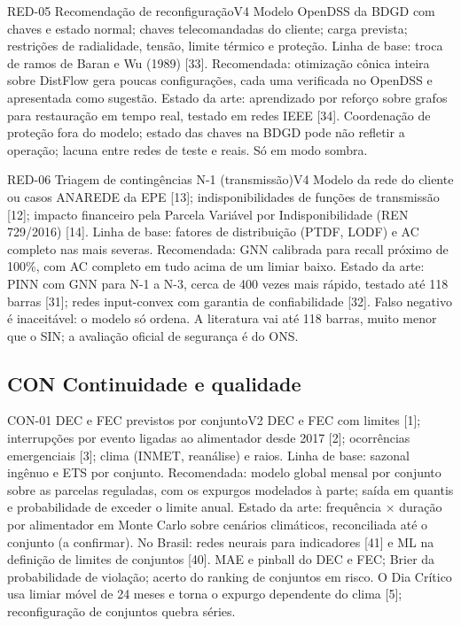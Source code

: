 \begin{ficha}{RED-05 \textperiodcentered{} Recomendação de reconfiguração}{V4}
 Modelo OpenDSS da BDGD com chaves e estado normal; chaves
telecomandadas do cliente; carga prevista; restrições de radialidade, tensão,
limite térmico e proteção.
 Linha de base: troca de ramos de Baran e Wu (1989) [33].
Recomendada: otimização cônica inteira sobre DistFlow gera poucas
configurações, cada uma verificada no OpenDSS e apresentada como sugestão.
Estado da arte: aprendizado por reforço sobre grafos para restauração em
tempo real, testado em redes IEEE [34].
 Coordenação de proteção fora do modelo; estado das chaves
na BDGD pode não refletir a operação; lacuna entre redes de teste e reais.
Só em modo sombra.
\end{ficha}

\begin{ficha}{RED-06 \textperiodcentered{} Triagem de contingências N-1 (transmissão)}{V4}
 Modelo da rede do cliente ou casos ANAREDE da EPE [13];
indisponibilidades de funções de transmissão [12]; impacto financeiro pela
Parcela Variável por Indisponibilidade (REN 729/2016) [14].
 Linha de base: fatores de distribuição (PTDF, LODF) e AC
completo nas mais severas. Recomendada: GNN calibrada para recall próximo de
100\%, com AC completo em tudo acima de um limiar baixo. Estado da arte: PINN
com GNN para N-1 a N-3, cerca de 400 vezes mais rápido, testado até 118 barras
[31]; redes input-convex com garantia de confiabilidade [32].
 Falso negativo é inaceitável: o modelo só ordena. A
literatura vai até 118 barras, muito menor que o SIN; a avaliação oficial de
segurança é do ONS.
\end{ficha}

\subsection{CON \textperiodcentered{} Continuidade e qualidade}

\begin{ficha}{CON-01 \textperiodcentered{} DEC e FEC previstos por conjunto}{V2}
 DEC e FEC com limites [1]; interrupções por evento ligadas ao
alimentador desde 2017 [2]; ocorrências emergenciais [3]; clima (INMET,
reanálise) e raios.
 Linha de base: sazonal ingênuo e ETS por conjunto.
Recomendada: modelo global mensal por conjunto sobre as parcelas reguladas,
com os expurgos modelados à parte; saída em quantis e probabilidade de
exceder o limite anual. Estado da arte: frequência × duração por alimentador
em Monte Carlo sobre cenários climáticos, reconciliada até o conjunto (a
confirmar). No Brasil: redes neurais para indicadores [41] e ML na definição
de limites de conjuntos [40].
 MAE e pinball do DEC e FEC; Brier da probabilidade de
violação; acerto do ranking de conjuntos em risco.
 O Dia Crítico usa limiar móvel de 24 meses e torna o
expurgo dependente do clima [5]; reconfiguração de conjuntos quebra séries.
\end{ficha}

